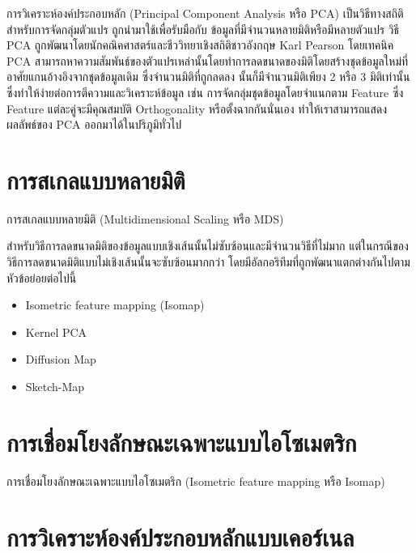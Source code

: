 การวิเคราะห์องค์ประกอบหลัก (Principal Component Analysis หรือ PCA) เป็นวิธีทางสถิติสำหรับการจัดกลุ่มตัวแปร ถูกนำมาใช้เพื่อรับมือกับ%
ข้อมูลที่มีจำนวนหลายมิติหรือมีหลายตัวแปร วิธี PCA ถูกพัฒนาโดยนักคณิคศาสตร์และชีววิทยาเชิงสถิติชาวอังกฤษ Karl Pearson โดยเทคนิค PCA 
สามารถหาความสัมพันธ์ของตัวแปรเหล่านั้นโดยทำการลดขนาดของมิติโดยสร้างชุดข้อมูลใหม่ที่อาศัยแกนอ้างอิงจากชุดข้อมูลเดิม ซึ่งจำนวนมิติที่ถูกลดลง%
นั้นก็มีจำนวนมิติเพียง 2 หรือ 3 มิติเท่านั้น ซึ่งทำให้ง่ายต่อการตีความและวิเคราะห์ข้อมูล เช่น การจัดกลุ่มชุดข้อมูลโดยจำแนกตาม Feature 
ซึ่ง Feature แต่ละคู่จะมีคุณสมบัติ Orthogonality หรือตั้งฉากกันนั่นเอง ทำให้เราสามารถแสดงผลลัพธ์ของ PCA ออกมาได้ในปริภูมิทั่วไป

\section{การสเกลแบบหลายมิติ}
\label{sec:mds}

การสเกลแบบหลายมิติ (Multidimensional Scaling หรือ MDS)\autocite{young1938,torgerson1952}

สำหรับวิธีการลดขนาดมิติของข้อมูลแบบเชิงเส้นนั้นไม่ซับซ้อนและมีจำนวนวิธีที่ไม่มาก แต่ในกรณีของวิธีการลดขนาดมิติแบบไม่เชิงเส้นนั้นจะซับซ้อนมากกว่า
โดยมีอัลกอริทึมที่ถูกพัฒนาแตกต่างกันไปตามหัวข้อย่อยต่อไปนี้\autocite{glielmo2021}

\begin{itemize}
    \item Isometric feature mapping (Isomap)
    \item Kernel PCA
    \item Diffusion Map
    \item Sketch-Map
\end{itemize}

\section{การเชื่อมโยงลักษณะเฉพาะแบบไอโซเมตริก}
\label{sec:isomap}

การเชื่อมโยงลักษณะเฉพาะแบบไอโซเมตริก (Isometric feature mapping หรือ Isomap)

\section{การวิเคราะห์องค์ประกอบหลักแบบเคอร์เนล}
\label{sec:kernel_pca}

